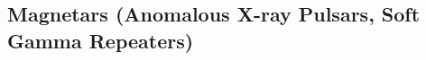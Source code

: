 \subsection{Magnetars (Anomalous X-ray Pulsars, Soft Gamma Repeaters)} \label{transients.s1.magnetars}
